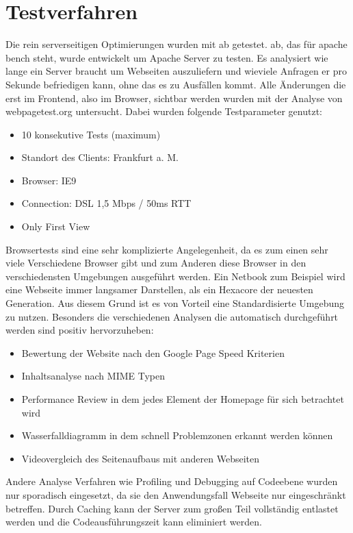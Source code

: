 \section{Testverfahren}
Die rein serverseitigen Optimierungen wurden mit ab getestet. ab, das für apache bench steht, wurde entwickelt um Apache Server zu testen. Es analysiert wie lange ein Server braucht um Webseiten auszuliefern und wieviele Anfragen er pro Sekunde befriedigen kann, ohne das es zu Ausfällen kommt. Alle Änderungen die erst im Frontend, also im Browser, sichtbar werden wurden mit der Analyse von  webpagetest.org untersucht. Dabei wurden folgende Testparameter genutzt:
\begin{itemize}
  \item 10 konsekutive Tests (maximum) 
  \item Standort des Clients: Frankfurt a. M.
  \item Browser: IE9
  \item Connection: DSL 1,5 Mbps / 50ms RTT
  \item Only First View
\end{itemize}
Browsertests sind eine sehr komplizierte Angelegenheit, da es zum einen sehr viele Verschiedene Browser gibt und zum Anderen diese Browser in den verschiedensten Umgebungen ausgeführt werden. Ein Netbook zum Beispiel wird eine Webseite immer langsamer Darstellen, als ein Hexacore der neuesten Generation. Aus diesem Grund ist es von Vorteil eine Standardisierte Umgebung zu nutzen. Besonders die verschiedenen Analysen die automatisch durchgeführt werden sind positiv hervorzuheben:
\begin{itemize}
 \item Bewertung der Website nach den Google Page Speed Kriterien
 \item Inhaltsanalyse nach MIME Typen
 \item Performance Review in dem jedes Element der Homepage für sich betrachtet wird 
 \item Wasserfalldiagramm in dem schnell Problemzonen erkannt werden können
 \item Videovergleich des Seitenaufbaus mit anderen Webseiten
\end{itemize}
Andere Analyse Verfahren wie Profiling und Debugging auf Codeebene wurden nur sporadisch eingesetzt, da sie den Anwendungsfall Webseite nur eingeschränkt betreffen. Durch Caching kann der Server zum großen Teil vollständig entlastet werden und die Codeausführungszeit kann eliminiert werden.

